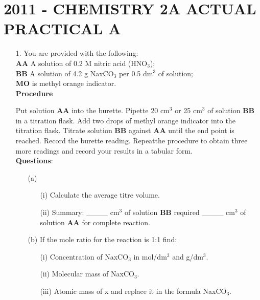 \section{2011 - CHEMISTRY 2A ACTUAL PRACTICAL A}

\begin{enumerate}
\item[1.] You are provided with the following:\\
\textbf{AA}  A solution of 0.2 M nitric acid (HNO$_3$);\\
\textbf{BB}  A solution of 4.2 g NaxCO$_3$ per 0.5 dm$^3$ of solution;\\
\textbf{MO} is methyl orange indicator.\\

\textbf{Procedure}\\
\vspace{-10pt}

Put solution \textbf{AA} into the burette. Pipette 20 cm$^3$ or 25 cm$^3$ of solution \textbf{BB} in a titration flask. Add two drops of methyl orange indicator into the titration flask. Titrate solution \textbf{BB} against \textbf{AA} until the end point is reached. Record the burette reading. Repeatthe procedure to obtain three more readings and record your results in a tabular form.\\[10pt]
\vspace{-10pt}
\textbf{Questions}:\\
\vspace{-6pt}
\begin{enumerate}
\item[(a)] 
\begin{enumerate}
\item[(i)] Calculate the average titre volume.
\item[(ii)] Summary:  \_\_\_\_ cm$^3$ of solution \textbf{BB} required \_\_\_\_ cm$^3$ of solution \textbf{AA} for complete reaction.
\end{enumerate}
\vspace{-2pt}
\item[(b)] If the mole ratio for the reaction is 1:1 find:\\
\vspace{-10pt}
\begin{enumerate}
\item[(i)] Concentration of NaxCO$_3$ in mol/dm$^3$ and g/dm$^3$.
\item[(ii)] Molecular mass of NaxCO$_3$.
\item[(iii)] Atomic mass of x and replace it in the formula NaxCO$_3$.
\end{enumerate}


\end{enumerate}
\end{enumerate}
